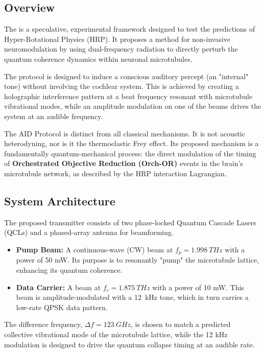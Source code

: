 \subsection{Overview}

The  is a speculative, experimental framework designed to test the predictions of Hyper-Rotational Physics (HRP). It proposes a method for non-invasive neuromodulation by using dual-frequency  radiation to directly perturb the quantum coherence dynamics within neuronal microtubules.

The protocol is designed to induce a conscious auditory percept (an "internal" tone) without involving the cochlear system. This is achieved by creating a holographic interference pattern at a beat frequency resonant with microtubule vibrational modes, while an amplitude modulation on one of the beams drives the system at an audible frequency.

\begin{keyconcept}
    The AID Protocol is distinct from all classical mechanisms. It is not acoustic heterodyning, nor is it the thermoelastic Frey effect. Its proposed mechanism is a fundamentally quantum-mechanical process: the direct modulation of the timing of \textbf{Orchestrated Objective Reduction (Orch-OR)} events in the brain's microtubule network, as described by the HRP interaction Lagrangian.
\end{keyconcept}


\subsection{System Architecture}

The proposed transmitter consists of two phase-locked Quantum Cascade Lasers (QCLs) and a phased-array antenna for beamforming.
\begin{itemize}
    \item \textbf{Pump Beam:} A continuous-wave (CW) beam at $f_p = \qty{1.998}{THz}$ with a power of 50 mW. Its purpose is to resonantly "pump" the microtubule lattice, enhancing its quantum coherence.
    \item \textbf{Data Carrier:} A beam at $f_c = \qty{1.875}{THz}$ with a power of 10 mW. This beam is amplitude-modulated with a \qty{12}{kHz} tone, which in turn carries a low-rate QPSK data pattern.
\end{itemize}
The difference frequency, $\Delta f = \qty{123}{GHz}$, is chosen to match a predicted collective vibrational mode of the microtubule lattice, while the 12 kHz modulation is designed to drive the quantum collapse timing at an audible rate.

